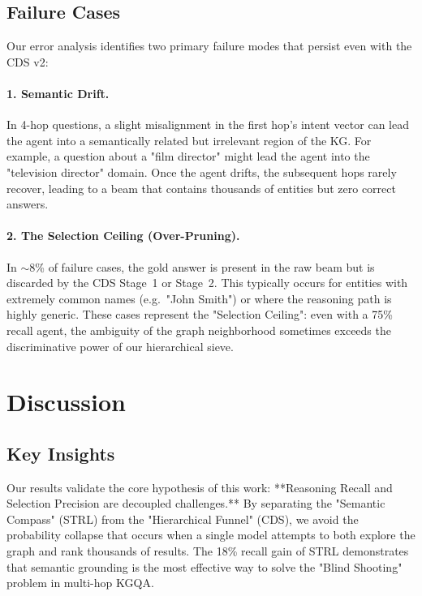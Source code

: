 \documentclass[11pt,a4paper]{article}
\begin{document}
\subsection{Failure Cases}
Our error analysis identifies two primary failure modes that persist even with
the CDS v2:
\paragraph{1. Semantic Drift.}
In 4-hop questions, a slight misalignment in the first hop's intent vector
can lead the agent into a semantically related but irrelevant region of the KG.
For example, a question about a "film director" might lead the agent into the
"television director" domain. Once the agent drifts, the subsequent hops
rarely recover, leading to a beam that contains thousands of entities but
zero correct answers.

\paragraph{2. The Selection Ceiling (Over-Pruning).}
In $\sim$8\% of failure cases, the gold answer is present in the raw beam
but is discarded by the CDS Stage~1 or Stage~2. This typically occurs for
entities with extremely common names (e.g.\ "John Smith") or where the
reasoning path is highly generic. These cases represent the "Selection
Ceiling": even with a 75\% recall agent, the ambiguity of the graph neighborhood
sometimes exceeds the discriminative power of our hierarchical sieve.


\section{Discussion}
\label{sec:discussion}

\subsection{Key Insights}
Our results validate the core hypothesis of this work: **Reasoning Recall
and Selection Precision are decoupled challenges.** 
By separating the "Semantic Compass" (STRL) from the "Hierarchical Funnel"
(CDS), we avoid the probability collapse that occurs when a single model
attempts to both explore the graph and rank thousands of results.
The 18\% recall gain of STRL demonstrates that semantic grounding is the
most effective way to solve the "Blind Shooting" problem in multi-hop KGQA.
\end{document}
